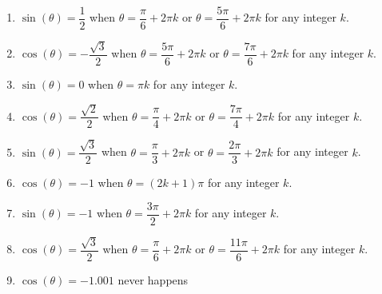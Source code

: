 \begin{enumerate}

\setcounter{enumi}{\value{HW}}

\item $\sin(\theta) = \dfrac{1}{2}$ when $\theta = \dfrac{\pi}{6} + 2\pi k$ or $\theta = \dfrac{5\pi}{6} + 2\pi k$ for any integer $k$.
\item $\cos(\theta) = -\dfrac{\sqrt{3}}{2}$ when $\theta = \dfrac{5\pi}{6} + 2\pi k$ or $\theta = \dfrac{7\pi}{6} + 2\pi k$ for any integer $k$.
\item $\sin(\theta) = 0$ when $\theta = \pi k$ for any integer $k$.
\item $\cos(\theta) = \dfrac{\sqrt{2}}{2}$ when $\theta = \dfrac{\pi}{4} + 2\pi k$ or $\theta = \dfrac{7\pi}{4} + 2\pi k$ for any integer $k$.
\item $\sin(\theta) = \dfrac{\sqrt{3}}{2}$ when $\theta = \dfrac{\pi}{3} + 2\pi k$ or $\theta = \dfrac{2\pi}{3} + 2\pi k$ for any integer $k$.
\item $\cos(\theta) = -1$ when $\theta = (2k + 1)\pi$ for any integer $k$.
\item  $\sin(\theta) = -1$ when $\theta = \dfrac{3\pi}{2} + 2\pi k$ for any integer $k$.
\item  $\cos(\theta) = \dfrac{\sqrt{3}}{2}$ when $\theta = \dfrac{\pi}{6} + 2\pi k$ or  $\theta = \dfrac{11\pi}{6} + 2\pi k$ for any integer $k$.
\item  $\cos(\theta) = -1.001$ never happens

\setcounter{HW}{\value{enumi}}

\end{enumerate}


